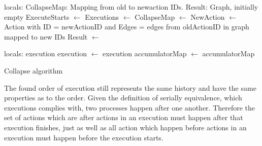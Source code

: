 	\begin{algorithm}
		\begin{algorithmic}
			\State
				locals: CollapseMap: Mapping from old to newaction IDs.
				\State\hspace{28pt} Result: Graph, initially empty
				\State
				\State ExecuteStarts $\leftarrow$  \State
				Executions $\leftarrow$ 
				\State
					CollapseMap $\leftarrow$ 
				\EndFor
					\State
					NewAction $\leftarrow$ Action with \State\hspace{28pt}ID = newActionID and \State\hspace{28pt}Edges = edges from oldActionID in graph mapped to new IDs\State
					Result $\leftarrow$  \State{}
				\EndFor
				
			\EndFunction
			\State
				\State locals: execution
				 \State
					execution $\leftarrow$ 
				\EndWhile\State
				\Return execution
			\EndFunction
			\State
				\State
					accumulatorMap $\leftarrow$ 
				\EndFor \State
				\Return accumulatorMap
			\EndFunction
		\end{algorithmic}
		\caption{Collapse algorithm}
		\label{alg:collapse}
	\end{algorithm}
	
	The found order of execution still represents the same history and have the same properties as to the order. Given the definition of serially equivalence, which executions complies with, two processes happen after one another. Therefore the set of actions which are after actions in an execution must happen after that execution finishes, just as well as all action which happen before actions in an execution must happen before the execution starts. 

